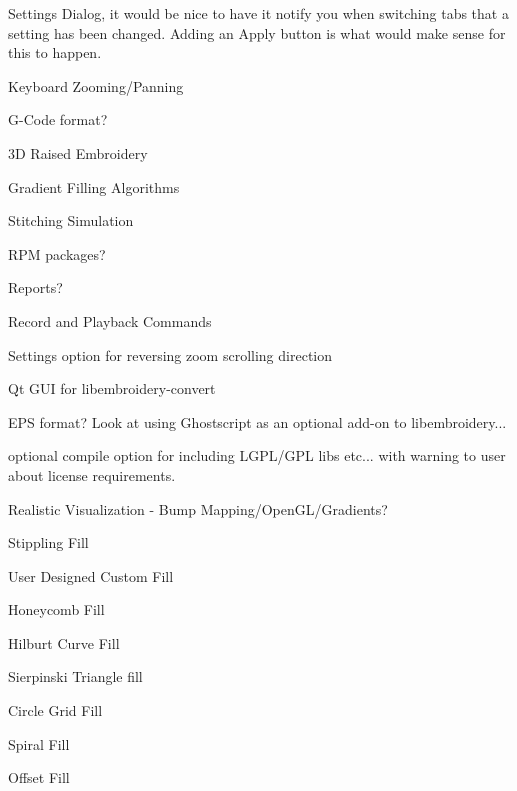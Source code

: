 \begin{DoxyRefList}
Settings Dialog, it would be nice to have it notify you when switching tabs that a setting has been changed. Adding an Apply button is what would make sense for this to happen. 



Keyboard Zooming/\+Panning 



G-\/\+Code format? 



3D Raised Embroidery 



Gradient Filling Algorithms 



Stitching Simulation 



RPM packages? 



Reports? 



Record and Playback Commands 



Settings option for reversing zoom scrolling direction 



Qt GUI for libembroidery-\/convert 



EPS format? Look at using Ghostscript as an optional add-\/on to libembroidery... 



optional compile option for including LGPL/\+GPL libs etc... with warning to user about license requirements. 



Realistic Visualization -\/ Bump Mapping/\+Open\+GL/\+Gradients? 



Stippling Fill 



User Designed Custom Fill 



Honeycomb Fill 



Hilburt Curve Fill 



Sierpinski Triangle fill 



Circle Grid Fill 



Spiral Fill 



Offset Fill 




\end{DoxyRefList}
